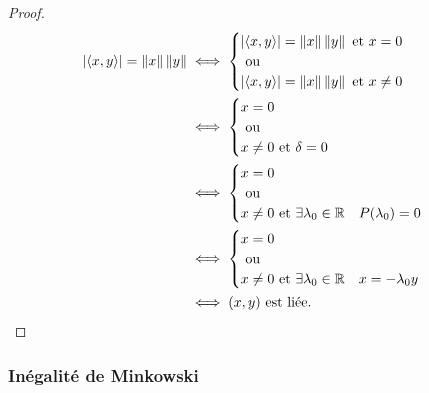 \begin{proof}
  \begin{align}
    \left\lvert\left\langle{x},{y}\right\rangle\right\rvert=\left\lVert x\right\rVert\left\lVert y\right\rVert
    &\iff
    \begin{cases}
      \left\lvert\left\langle{x},{y}\right\rangle\right\rvert=\left\lVert x\right\rVert\left\lVert y\right\rVert \text{~et~} x=0 \\ \text{~ou~} \\
      \left\lvert\left\langle{x},{y}\right\rangle\right\rvert=\left\lVert x\right\rVert\left\lVert y\right\rVert \text{~et~} x\neq 0
    \end{cases}\\
    &\iff
    \begin{cases}
      x=0 \\ \text{~ou~} \\
      x\neq 0 \text{~et~}  \delta=0
    \end{cases}\\
    &\iff
    \begin{cases}
      x=0 \\ \text{~ou~} \\
      x\neq 0 \text{~et~}  \exists \lambda_0 \in \mathbb{R} \quad P(\lambda_0)=0
    \end{cases}\\
    &\iff
    \begin{cases}
      x=0 \\ 
      \text{~ou~} \\
      x\neq 0 \text{~et~}  \exists \lambda_0 \in \mathbb{R} \quad x=-\lambda_0 y
    \end{cases}\\
    &\iff (x,y) \text{~est liée}.
  \end{align}
\end{proof}

\subsubsection{Inégalité de Minkowski}

